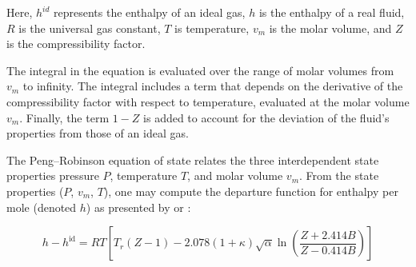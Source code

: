 \documentclass[../Article_Model_Parameters.tex]{subfiles}
\begin{document}
	Here, $h^{id}$ represents the enthalpy of an ideal gas, $h$ is the enthalpy of a real fluid, $R$ is the universal gas constant, $T$ is temperature, $v_m$ is the molar volume, and $Z$ is the compressibility factor.
	
	The integral in the equation is evaluated over the range of molar volumes from $v_m$ to infinity. The integral includes a term that depends on the derivative of the compressibility factor with respect to temperature, evaluated at the molar volume $v_m$. Finally, the term $1-Z$ is added to account for the deviation of the fluid's properties from those of an ideal gas.

	The Peng–Robinson equation of state relates the three interdependent state properties pressure $P$, temperature $T$, and molar volume $v_m$. From the state properties ($P$, $v_m$, $T$), one may compute the departure function for enthalpy per mole (denoted $h$) as presented by \citet{Gmehling2019} or \citet{Elliott2011}:
	
	{\footnotesize
		\begin{equation}
			h-h^{\mathrm {id} }=RT\left[T_{r}(Z-1)-2.078(1+\kappa ){\sqrt {\alpha }}\ln \left({\frac {Z+2.414B}{Z-0.414B}}\right)\right]
		\end{equation}
	}
	
	
\end{document}
